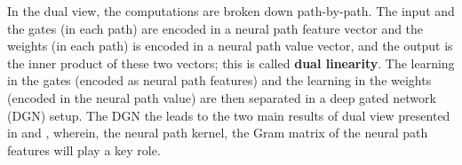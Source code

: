 In the dual view, the computations are broken down path-by-path. The input and the gates (in each path) are encoded in a neural path feature vector and the weights (in each path) is encoded in a neural path value vector, and the output is the inner product of these two vectors; this is called \textbf{dual linearity}.  The learning in the gates (encoded as neural path features) and the learning in the weights (encoded in the neural path value) are then separated in a deep gated network (DGN) setup. The DGN the leads to the two main results of dual view presented in  and , wherein, the neural path kernel, the Gram matrix of the neural path features will play a key role. %

